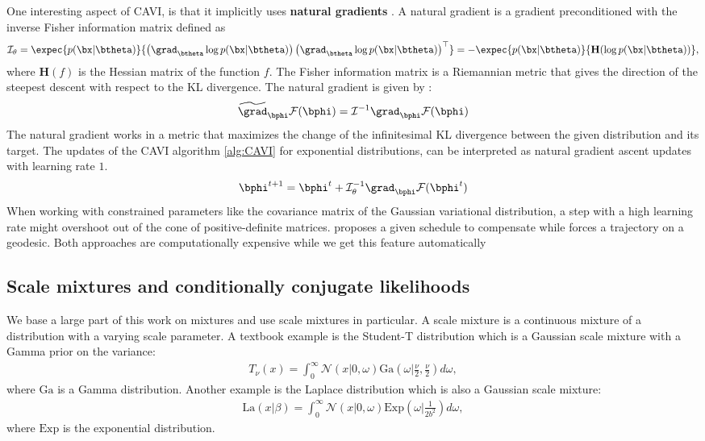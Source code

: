 One interesting aspect of \ac{CAVI}, is that it implicitly uses \textbf{natural gradients} \cite{amariNaturalGradientWorks1998}.
A natural gradient is a gradient preconditioned with the inverse Fisher information matrix defined as
\begin{align}
    \mathcal{I}_\theta = \expec{p(\bx|\btheta)}{\left(\grad_{\btheta}\log p(\bx|\btheta)\right)\left(\grad_{\btheta} \log p(\bx|\btheta)\right)^\top} = -\expec{p(\bx|\btheta)}{\mathbf{H}(\log p(\bx|\btheta))},
    \label{eq:fisherinfomatrix}
\end{align}
where $\mathbf{H}(f)$ is the Hessian matrix of the function $f$.
The Fisher information matrix is a Riemannian metric that gives the direction of the steepest descent with respect to the \ac{KL} divergence.
The natural gradient is given by :
\begin{align*}
    \widetilde{\grad}_{\bphi}\mathcal{F}(\bphi) = \mathcal{I}^{-1} \grad_{\bphi}\mathcal{F}(\bphi)
\end{align*}
The natural gradient works in a metric that maximizes the change of the infinitesimal \ac{KL} divergence between the given distribution and its target\cite{salimbeniNaturalGradientsPractice2018}.
The updates of the \ac{CAVI} algorithm \ref{alg:CAVI} for exponential distributions, can be interpreted as natural gradient ascent updates with learning rate $1$.
\begin{align*}
    \bphi^{t+1} = \bphi^t + \mathcal{I}^{-1}_\theta\grad_{\bphi}\mathcal{F}(\bphi^t)
\end{align*}
When working with constrained parameters like the covariance matrix of the Gaussian variational distribution, a step with a high learning rate might overshoot out of the cone of positive-definite matrices.
\citet{salimbeniNaturalGradientsPractice2018} proposes a given schedule to compensate while \citet{linHandlingPositiveDefiniteConstraint2020} forces a trajectory on a geodesic.
Both approaches are computationally expensive while we get this feature automatically 

\subsection{Scale mixtures and conditionally conjugate likelihoods}
\label{sec:scale-mixtures}
We base a large part of this work on mixtures and use scale mixtures in particular.
A scale mixture is a continuous mixture of a distribution with a varying scale parameter.
A textbook example is the Student-T distribution which is a Gaussian scale mixture with a Gamma prior on the variance:
\begin{align*}
    T_\nu(x) = \int_{0}^\infty \mathcal{N}\left(x|0,\omega\right)\mathrm{Ga}\left(\omega|\frac{\nu}{2}, \frac{\nu}{2}\right)d\omega,
\end{align*}
where $\mathrm{Ga}$ is a Gamma distribution.
Another example is the Laplace distribution which is also a Gaussian scale mixture:
\begin{align*}
    \mathrm{La}(x|\beta) = \int_0^{\infty} \mathcal{N}(x|0,\omega)\mathrm{Exp}\left(\omega|\frac{1}{2b^2}\right)d\omega,
\end{align*}
where $\mathrm{Exp}$ is the exponential distribution.

